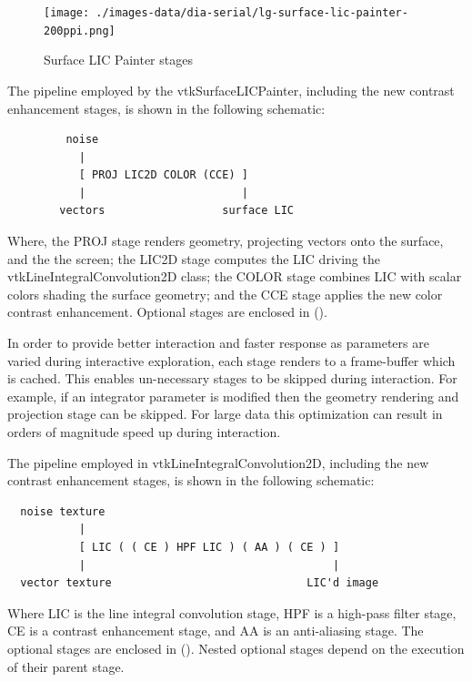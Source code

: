 \documentclass[a4paper,10pt]{article}
\begin{document}
\begin{figure}[ht]
	\centering
	\texttt{[image: ./images-data/dia-serial/lg-surface-lic-painter-200ppi.png]}
	\label{fig:lic2d-outputs}
  \caption{Surface LIC Painter stages}
\end{figure}

The pipeline employed by the vtkSurfaceLICPainter, including the new contrast enhancement stages, is shown in the following schematic:
\begin{center}
\footnotesize\bf
\begin{verbatim}
         noise
           |
           [ PROJ LIC2D COLOR (CCE) ]
           |                        |
        vectors                  surface LIC
\end{verbatim}%
\end{center}
Where, the PROJ stage renders geometry, projecting vectors onto the surface, and the the screen; the LIC2D stage computes the LIC driving the vtkLineIntegralConvolution2D class; the COLOR stage combines LIC with scalar colors shading the surface geometry; and the CCE stage applies the new color contrast enhancement. Optional stages are enclosed in ().

In order to provide better interaction and faster response as parameters are varied during interactive exploration, each stage renders to a frame-buffer which is cached. This enables un-necessary stages to be skipped during interaction. For example, if an integrator parameter is modified then the geometry rendering and projection stage can be skipped. For large data this optimization can result in orders of magnitude speed up during interaction.

The pipeline employed in vtkLineIntegralConvolution2D, including the new contrast enhancement stages, is shown in the following schematic:
\begin{center}
\footnotesize\bf
\begin{verbatim}
  noise texture
           |
           [ LIC ( ( CE ) HPF LIC ) ( AA ) ( CE ) ]
           |                                      |
  vector texture                              LIC'd image
\end{verbatim}%
\end{center}
Where LIC is the line integral convolution stage, HPF is a high-pass filter stage, CE is a contrast enhancement stage, and AA is an anti-aliasing stage. The optional stages are enclosed in (). Nested optional stages depend on the execution of their parent stage.
\end{document}

